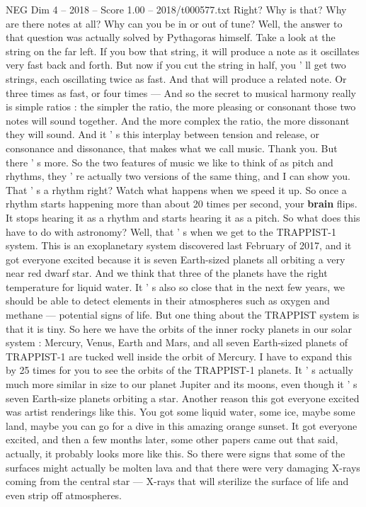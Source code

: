 \begin{textsample}{NEG Dim 4 – 2018 – Score 1.00 – 2018/t000577.txt}
Right?
Why is that?
Why are there notes at all?
Why can you be in or out of tune?
Well, the answer to that question was actually solved by Pythagoras himself.
Take a look at the string on the far left.
If you bow that string, it will produce a note as it oscillates very fast back and forth.
But now if you cut the string in half, you ' ll get two strings, each oscillating twice as fast.
And that will produce a related note.
Or three times as fast, or four times — And so the secret to musical harmony really is simple ratios : the simpler the ratio, the more pleasing or consonant those two notes will sound together.
And the more complex the ratio, the more dissonant they will sound.
And it ' s this interplay between tension and release, or consonance and dissonance, that makes what we call music.
Thank you.
But there ' s more.
So the two features of music we like to think of as pitch and rhythms, they ' re actually two versions of the same thing, and I can show you.
That ' s a rhythm right?
Watch what happens when we speed it up.
So once a rhythm starts happening more than about 20 times per second, your \textbf{brain} flips.
It stops hearing it as a rhythm and starts hearing it as a pitch.
So what does this have to do with astronomy?
Well, that ' s when we get to the TRAPPIST-1 system.
This is an exoplanetary system discovered last February of 2017, and it got everyone excited because it is seven Earth-sized planets all orbiting a very near red dwarf star.
And we think that three of the planets have the right temperature for liquid water.
It ' s also so close that in the next few years, we should be able to detect elements in their atmospheres such as oxygen and methane — potential signs of life.
But one thing about the TRAPPIST system is that it is tiny.
So here we have the orbits of the inner rocky planets in our solar system : Mercury, Venus, Earth and Mars, and all seven Earth-sized planets of TRAPPIST-1 are tucked well inside the orbit of Mercury.
I have to expand this by 25 times for you to see the orbits of the TRAPPIST-1 planets.
It ' s actually much more similar in size to our planet Jupiter and its moons, even though it ' s seven Earth-size planets orbiting a star.
Another reason this got everyone excited was artist renderings like this.
You got some liquid water, some ice, maybe some land, maybe you can go for a dive in this amazing orange sunset.
It got everyone excited, and then a few months later, some other papers came out that said, actually, it probably looks more like this.
So there were signs that some of the surfaces might actually be molten lava and that there were very damaging X-rays coming from the central star — X-rays that will sterilize the surface of life and even strip off atmospheres.

\end{textsample}

